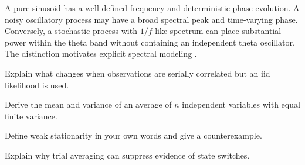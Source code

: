\begin{workedexample}
A pure sinusoid has a well-defined frequency and deterministic phase evolution. A noisy oscillatory process may have a broad spectral peak and time-varying phase. Conversely, a stochastic process with $1/f$-like spectrum can place substantial power within the theta band without containing an independent theta oscillator. The distinction motivates explicit spectral modeling \cite{Donoghue2020,Gerster2022}.
\end{workedexample}
\begin{exercises}
\item Explain what changes when observations are serially correlated but an iid likelihood is used.
\item Derive the mean and variance of an average of $n$ independent variables with equal finite variance.
\item Define weak stationarity in your own words and give a counterexample.
\item Explain why trial averaging can suppress evidence of state switches.
\end{exercises}
